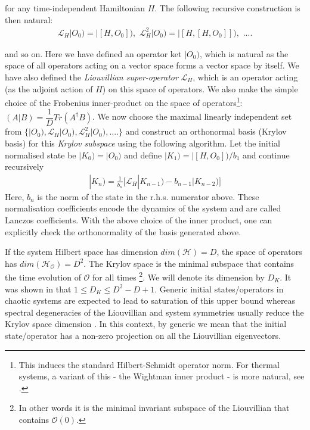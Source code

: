 \documentclass[a4paper,12pt]{article}
\begin{document}
for any time-independent Hamiltonian $H$. The  following recursive construction is then natural: 
\begin{align}
\mathcal{L}_H|O_0)= |[H,O_0]),\,\, \mathcal{L}_H^ 2|O_0)= |[H,[H,O_0]]),\,\,....  \nonumber
\end{align}

and so on. Here we have defined an operator ket $|O_0)$, which is natural as the space of all operators acting on a vector space forms a vector space by itself. We have also defined the {\it Liouvillian super-operator} $\mathcal{L}_H$, which is an operator acting (as the adjoint action of $H$) on this space of operators. We also make the simple choice of the Frobenius inner-product on the space of operators\footnote{This induces the standard Hilbert-Schmidt operator norm. For thermal systems, a variant of this - the Wightman inner product - is more natural, see \cite{Parker_2019}.}: $(A|B)=\dfrac{1}{D}Tr(A^ {\dagger}B)$. We now choose the maximal linearly independent set from $\{|O_0), \mathcal{L}_H|O_0),\mathcal{L}_H^ 2 |O_0),.... \}$  and construct an orthonormal basis (Krylov basis) for this {\it Krylov subspace} using the following algorithm. Let the initial normalised state be $|K_0)=|O_0)$ and define $|K_1)=|[H,O_0])/b_1$ and continue recursively
\begin{align} \label{Lbasis}
|K_n)=\frac{1}{b_n}\big[\mathcal{L}_H |K_{n-1})-b_{n-1}|K_{n-2}) \big]
\end{align} 
Here, $b_n$ is the norm of the state in the r.h.s. numerator above. These normalisation coefficients encode the dynamics of the system and are called Lanczos coefficients. With the above choice of the inner product, one can explicitly check the orthonormality of the basis generated above.

If the system Hilbert space has dimension  $dim(\mathcal{H})=D$, the space of operators has $dim(\mathcal{H_O})=D^2$. 
The Krylov space is the minimal subspace  that contains the time evolution of $\mathcal{O}$ for all times \footnote{In other words it is the minimal invariant subspace of the Liouvillian that contains $\mathcal{O}(0)$.}. We will denote its dimension by $D_K$. It was shown in \cite{Rabinovici_2021} that $1\leq D_K\leq D^2-D+1$. Generic initial states/operators in chaotic systems are expected to lead to saturation of this upper bound whereas spectral degeneracies of the Liouvillian and system symmetries usually reduce the Krylov space dimension \cite{Rabinovici_2021, Rabinovici_2022}.
In this context, by generic  we mean that the initial state/operator has a non-zero projection on all the Liouvillian eigenvectors.
\end{document}
